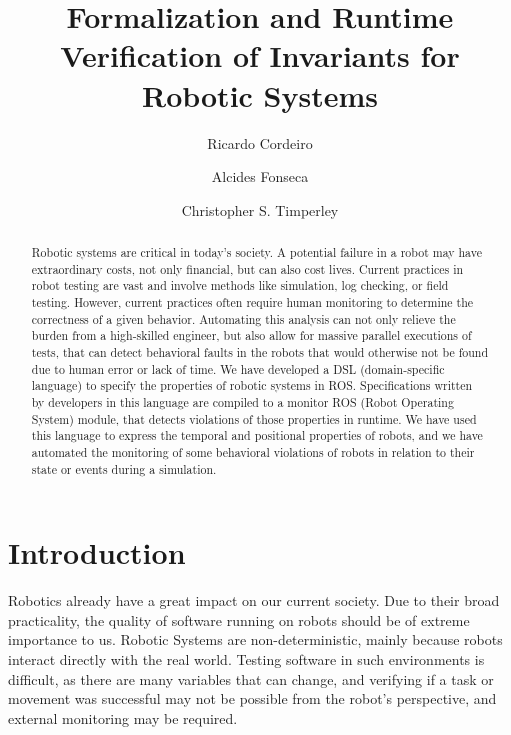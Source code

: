 \documentclass[runningheads]{llncs}
\begin{document}
%
\title{Formalization and Runtime Verification of Invariants for
Robotic Systems}
%
%
\author{Ricardo Cordeiro \and
Alcides Fonseca \and
Christopher S. Timperley}
%
%
%
\maketitle              %
%
\begin{abstract}
    Robotic systems are critical in today's society. A potential failure in a robot may have extraordinary costs, not only financial, but can also cost lives.
    Current practices in robot testing are vast and involve methods like simulation, log checking, or field testing. However, current practices often require human monitoring to determine the correctness of a given behavior. Automating this analysis can not only relieve the burden from a high-skilled engineer, but also allow for massive parallel executions of tests, that can detect behavioral faults in the robots that would otherwise not be found due to human error or lack of time.
    We have developed a DSL (domain-specific language) to specify the properties of robotic systems in ROS. Specifications written by developers in this language are compiled to a monitor ROS (Robot Operating System) module, that detects violations of those properties in runtime. We have used this language to express the temporal and positional properties of robots, and we have automated the monitoring of some behavioral violations of robots in relation to their state or events during a simulation.

\end{abstract}
%
%
%
\section{Introduction}

Robotics already have a great impact on our current society. Due to their broad practicality, the quality of software running on robots should be of extreme importance to us. Robotic Systems are non-deterministic, mainly because robots interact directly with the real world. Testing software in such environments is difficult, as there are many variables that can change, and verifying if a task or movement was successful may not be possible from the robot's perspective, and external monitoring may be required.
\end{document}
